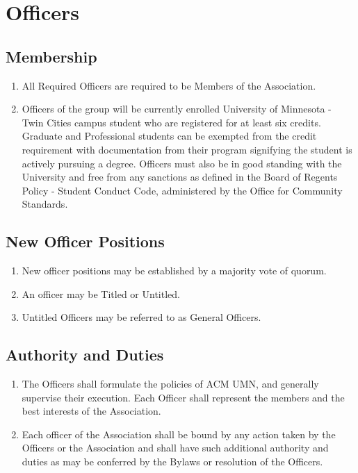 \section{Officers}

\subsection{Membership}
\begin{enumerate}
	\item All Required Officers are required to be Members of the Association.
	\item Officers of the group will be currently enrolled University of Minnesota - Twin Cities campus student who are registered for at least six credits. Graduate and Professional students can be exempted from the credit requirement with documentation from their program signifying the student is actively pursuing a degree. Officers must also be in good standing with the University and free from any sanctions as defined in the Board of Regents Policy - Student Conduct Code, administered by the Office for Community Standards. 
\end{enumerate}

\subsection{New Officer Positions}
\begin{enumerate}
	\item New officer positions may be established by a majority vote of quorum.
	\item An officer may be Titled or Untitled.
	\item Untitled Officers may be referred to as General Officers.
\end{enumerate}

\subsection{Authority and Duties}
\begin{enumerate}
	\item The Officers shall formulate the policies of ACM UMN, and generally supervise their execution. Each Officer shall represent the members and the best interests of the Association.
	\item Each officer of the Association shall be bound by any action taken by the Officers or the Association and shall have such additional authority and duties as may be conferred by the Bylaws or resolution of the Officers.
\end{enumerate}

